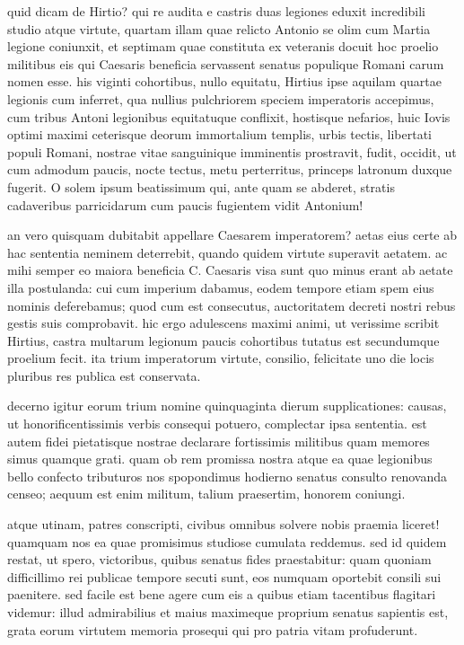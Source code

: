  quid dicam de Hirtio? qui re audita e castris duas legiones eduxit incredibili studio atque virtute, quartam illam quae relicto Antonio se olim cum Martia legione coniunxit, et septimam quae constituta ex veteranis docuit hoc proelio militibus eis qui Caesaris beneficia servassent senatus populique Romani carum nomen esse. his viginti cohortibus, nullo equitatu, Hirtius ipse aquilam quartae legionis cum inferret, qua nullius pulchriorem speciem imperatoris accepimus, cum tribus Antoni legionibus equitatuque conflixit, hostisque nefarios, huic Iovis optimi maximi ceterisque deorum immortalium templis, urbis tectis, libertati populi Romani, nostrae vitae sanguinique imminentis prostravit, fudit, occidit, ut cum admodum paucis, nocte tectus, metu perterritus, princeps latronum duxque fugerit. O solem ipsum beatissimum qui, ante quam se abderet, stratis cadaveribus parricidarum cum paucis fugientem vidit Antonium!

 an vero quisquam dubitabit appellare Caesarem imperatorem? aetas eius certe ab hac sententia neminem deterrebit, quando quidem virtute superavit aetatem. ac mihi semper eo maiora beneficia C. Caesaris visa sunt quo minus erant ab aetate illa postulanda: cui cum imperium dabamus, eodem tempore etiam spem eius nominis deferebamus; quod cum est consecutus, auctoritatem decreti nostri rebus gestis suis comprobavit. hic ergo adulescens maximi animi, ut verissime scribit Hirtius, castra multarum legionum paucis cohortibus tutatus est secundumque proelium fecit. ita trium imperatorum virtute, consilio, felicitate uno die locis pluribus res publica est conservata.

 decerno igitur eorum trium nomine quinquaginta dierum supplicationes: causas, ut honorificentissimis verbis consequi potuero, complectar ipsa sententia. est autem fidei pietatisque nostrae declarare fortissimis militibus quam memores simus quamque grati. quam ob rem promissa nostra atque ea quae legionibus bello confecto tributuros nos spopondimus hodierno senatus consulto renovanda censeo; aequum est enim militum, talium praesertim, honorem coniungi.

 atque utinam, patres conscripti, civibus omnibus solvere nobis praemia liceret! quamquam nos ea quae promisimus studiose cumulata reddemus. sed id quidem restat, ut spero, victoribus, quibus senatus fides praestabitur: quam quoniam difficillimo rei publicae tempore secuti sunt, eos numquam oportebit consili sui paenitere. sed facile est bene agere cum eis a quibus etiam tacentibus flagitari videmur: illud admirabilius et maius maximeque proprium senatus sapientis est, grata eorum virtutem memoria prosequi qui pro patria vitam profuderunt.

